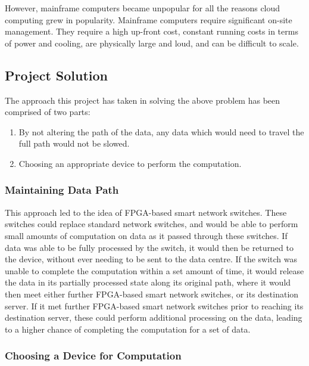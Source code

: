 However, mainframe computers became unpopular for all the reasons cloud computing grew in popularity. Mainframe computers require significant on-site management. They require a high up-front cost, constant running costs in terms of power and cooling, are physically large and loud, and can be difficult to scale.

\subsection{Project Solution}
\label{project_solution}


The approach this project has taken in solving the above problem has been comprised of two parts:
\begin{enumerate}
  \item By not altering the path of the data, any data which would need to travel the full path would not be slowed.
  \item Choosing an appropriate device to perform the computation.
\end{enumerate}

\subsubsection{Maintaining Data Path}

This approach led to the idea of FPGA-based smart network switches. These switches could replace standard network switches, and would be able to perform small amounts of computation on data as it passed through these switches. If data was able to be fully processed by the switch, it would then be returned to the device, without ever needing to be sent to the data centre. If the switch was unable to complete the computation within a set amount of time, it would release the data in its partially processed state along its original path, where it would then meet either further FPGA-based smart network switches, or its destination server. If it met further FPGA-based smart network switches prior to reaching its destination server, these could perform additional processing on the data, leading to a higher chance of completing the computation for a set of data.

\subsubsection{Choosing a Device for Computation}

